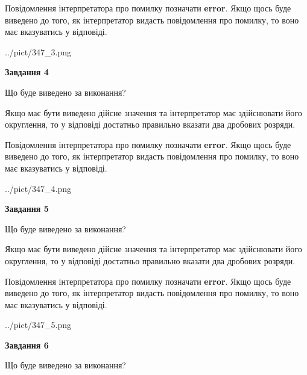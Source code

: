 \documentclass[12pt, ukrainian]{article}
\begin{document}
{\begin {Large}
Повідомлення інтерпретатора про помилку позначати \textbf{error}.
Якщо щось буде виведено до того, як інтерпретатор видасть повідомлення про помилку, 
то воно має вказуватись у відповіді. \par

\begin{center}
	{../pict/347_3.png}
\end{center}
\newpage

{\begin {center}\textbf{Завдання 4}\end {center}}\par
Що буде виведено за виконання? \par

Якщо має бути виведено дійсне значення та інтерпретатор має здійснювати його округлення, 
то у відповіді достатньо правильно вказати два дробових розряди.

Повідомлення інтерпретатора про помилку позначати \textbf{error}.
Якщо щось буде виведено до того, як інтерпретатор видасть повідомлення про помилку, 
то воно має вказуватись у відповіді. \par

\begin{center}
	{../pict/347_4.png}
\end{center}
\newpage

{\begin {center}\textbf{Завдання 5}\end {center}}\par
Що буде виведено за виконання? \par

Якщо має бути виведено дійсне значення та інтерпретатор має здійснювати його округлення, 
то у відповіді достатньо правильно вказати два дробових розряди.

Повідомлення інтерпретатора про помилку позначати \textbf{error}.
Якщо щось буде виведено до того, як інтерпретатор видасть повідомлення про помилку, 
то воно має вказуватись у відповіді. \par

\begin{center}
	{../pict/347_5.png}
\end{center}
\newpage

{\begin {center}\textbf{Завдання 6}\end {center}}\par
Що буде виведено за виконання? \par


\end{Large}}
\end{document}
